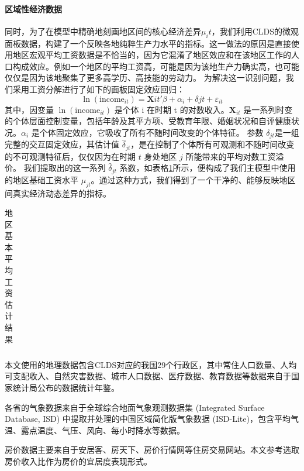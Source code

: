 \documentclass[master, final]{zufe-thesis}
\begin{document}
\paragraph{区域性经济数据}

同时，为了在模型中精确地刻画地区间的核心经济差异$\mu_it$，我们利用CLDS的微观面板数据，构建了一个反映各地纯粹生产力水平的指标。这一做法的原因是直接使用地区宏观平均工资数据是不恰当的，因为它混淆了地区效应和在该地区工作的人口构成效应。例如一个地区的平均工资高，可能是因为该地生产力确实高，也可能仅仅是因为该地聚集了更多高学历、高技能的劳动力。
为解决这一识别问题，我们采用工资分解进行了如下的面板固定效应回归：
\begin{equation}
\ln(\text{income}_{it}) = \mathbf{X}{it}'\beta + \alpha_i + \delta{jt} + \varepsilon_{it}
\label{eq:wage_decomposition}
\end{equation}
其中，因变量 $\ln(\text{income}_{it})$ 是个体 i 在时期 t 的对数收入。$\mathbf{X}_{it}$ 是一系列时变的个体层面控制变量，包括年龄及其平方项、受教育年限、婚姻状况和自评健康状况。$\alpha_i$ 是个体固定效应，它吸收了所有不随时间改变的个体特征。
参数 $\delta_{jt}$是一组完整的交互固定效应，其估计值 $\hat{\delta}_{jt}$，是在控制了个体所有可观测和不随时间改变的不可观测特征后，仅仅因为在时期 $t$ 身处地区 $j$ 所能带来的平均对数工资溢价。
我们提取出的这一系列 $\hat{\delta}_{jt}$ 系数，如表格\ref{tab:地区基本平均工资估计结果}所示，便构成了我们主模型中使用的地区基础工资水平 $\mu_{jt}$。通过这种方式，我们得到了一个干净的、能够反映地区间真实经济动态差异的指标。

\begin{table}[!ht]
\centering
\caption{地区基本平均工资估计结果}
\begin{tabularx}{\textwidth}{@{}cXXX@{}}
\toprule
\midrule
\bottomrule
\end{tabularx}
\label{tab:地区基本平均工资估计结果}
\end{table}





本文使用的地理数据包含CLDS对应的我国29个行政区，其中常住人口数量、人均可支配收入、自然灾害数据、城市人口数据、医疗数据、教育数据等数据来自于国家统计局公布的数据统计年鉴。

各省的气象数据来自于全球综合地面气象观测数据集 (Integrated Surface Database, ISD) 中提取并处理的中国区域简化版气象数据 (ISD-Lite)，包含平均气温、露点温度、气压、风向、每小时降水等数据。

房价数据主要来自于安居客、房天下、房价行情网等住房交易网站。本文参考\textcite{LiHuiFangJieFangJieShouRuBiYuLiuDongRenKouChangQiJuLiuYiYuanLaiZiLiuDongRenKouDeWeiGuanZhengJu2019}选取房价收入比作为房价的宜居度表现形式。
\end{document}

